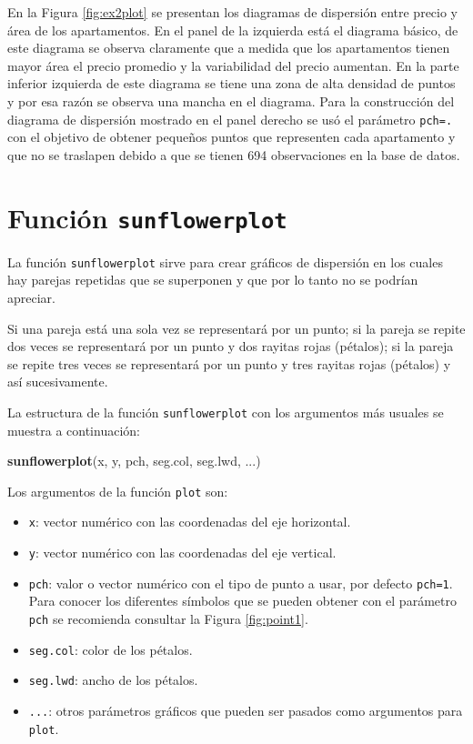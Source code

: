 \documentclass[10pt,]{krantz}
\makeatletter
\newenvironment{Shaded}{\begin{snugshade}}{\end{snugshade}}
\newcommand{\KeywordTok}[1]{\textcolor[rgb]{0.13,0.29,0.53}{\textbf{#1}}}
\newcommand{\NormalTok}[1]{#1}
\providecommand{\tightlist}{%
  \setlength{\itemsep}{0pt}\setlength{\parskip}{0pt}}
\newenvironment{kframe}{%
\medskip{}
\setlength{\fboxsep}{.8em}
 \def\at@end@of@kframe{}%
 \ifinner\ifhmode%
  \def\at@end@of@kframe{\end{minipage}}%
  \begin{minipage}{\columnwidth}%
 \fi\fi%
 \def\FrameCommand##1{\hskip\@totalleftmargin \hskip-\fboxsep
 \colorbox{shadecolor}{##1}\hskip-\fboxsep
     \hskip-\linewidth \hskip-\@totalleftmargin \hskip\columnwidth}%
 \MakeFramed {\advance\hsize-\width
   \@totalleftmargin\z@ \linewidth\hsize
   \@setminipage}}%
 {\par\unskip\endMakeFramed%
 \at@end@of@kframe}
\renewenvironment{Shaded}{\begin{kframe}}{\end{kframe}}
\makeatother
\begin{document}
En la Figura \ref{fig:ex2plot} se presentan los diagramas de dispersión
entre precio y área de los apartamentos. En el panel de la izquierda
está el diagrama básico, de este diagrama se observa claramente que a
medida que los apartamentos tienen mayor área el precio promedio y la
variabilidad del precio aumentan. En la parte inferior izquierda de este
diagrama se tiene una zona de alta densidad de puntos y por esa razón se
observa una mancha en el diagrama. Para la construcción del diagrama de
dispersión mostrado en el panel derecho se usó el parámetro
\texttt{pch=\textquotesingle{}.\textquotesingle{}} con el objetivo de
obtener pequeños puntos que representen cada apartamento y que no se
traslapen debido a que se tienen 694 observaciones en la base de datos.

\section{\texorpdfstring{Función \texttt{sunflowerplot}
}{Función sunflowerplot }}\label{funcion-sunflowerplot}

La función \texttt{sunflowerplot} sirve para crear gráficos de
dispersión en los cuales hay parejas repetidas que se superponen y que
por lo tanto no se podrían apreciar.

Si una pareja está una sola vez se representará por un punto; si la
pareja se repite dos veces se representará por un punto y dos rayitas
rojas (pétalos); si la pareja se repite tres veces se representará por
un punto y tres rayitas rojas (pétalos) y así sucesivamente.

La estructura de la función \texttt{sunflowerplot} con los argumentos
más usuales se muestra a continuación:

\begin{Shaded}
\begin{Highlighting}[]
\KeywordTok{sunflowerplot}\NormalTok{(x, y, pch, seg.col, seg.lwd, ...)}
\end{Highlighting}
\end{Shaded}

Los argumentos de la función \texttt{plot} son:

\begin{itemize}
\tightlist
\item
  \texttt{x}: vector numérico con las coordenadas del eje horizontal.
\item
  \texttt{y}: vector numérico con las coordenadas del eje vertical.
\item
  \texttt{pch}: valor o vector numérico con el tipo de punto a usar, por
  defecto \texttt{pch=1}. Para conocer los diferentes símbolos que se
  pueden obtener con el parámetro \texttt{pch} se recomienda consultar
  la Figura \ref{fig:point1}.
\item
  \texttt{seg.col}: color de los pétalos.
\item
  \texttt{seg.lwd}: ancho de los pétalos.
\item
  \texttt{...}: otros parámetros gráficos que pueden ser pasados como
  argumentos para \texttt{plot}.
\end{itemize}
\end{document}
